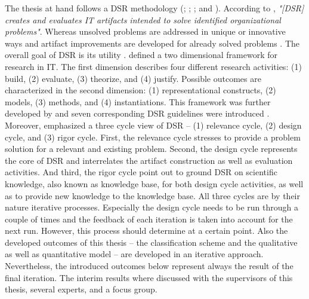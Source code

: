 The thesis at hand follows a \ac{DSR} methodology (\citealp{March1995}; \citealp{Hevner2004}; \citealp{Hevner2007}; and \citealp{Peffers2007}). According to \citet[p. 77]{Hevner2004}, \textit{"[\ac{DSR}] creates and evaluates IT artifacts intended to solve identified organizational problems"}. Whereas unsolved problems are addressed in unique or innovative ways and artifact improvements are developed for already solved problems \citep[p. 81]{Hevner2004}. The overall goal of \ac{DSR} is its utility \citep[p. 80]{Hevner2004}.
\citet[pp. 255-262]{March1995} defined a two dimensional framework for research in \ac{IT}. The first dimension describes four different research activities: (1) build, (2) evaluate, (3) theorize, and (4) justify. Possible outcomes are characterized in the second dimension: (1) representational constructs, (2) models, (3) methods, and (4) instantiations. This framework was further developed by \citet[pp. 78-81]{Hevner2004} and seven corresponding \ac{DSR} guidelines were introduced \citep[pp. 82-90]{Hevner2004}. Moreover, \citet[pp. 87-92]{Hevner2007} emphasized a three cycle view of \ac{DSR} -- (1) relevance cycle, (2) design cycle, and (3) rigor cycle. First, the relevance cycle stresses to provide a problem solution for a relevant and existing problem. Second, the design cycle represents the core of \ac{DSR} and interrelates the artifact construction as well as evaluation activities. And third, the rigor cycle point out to ground \ac{DSR} on scientific knowledge, also known as knowledge base, for both design cycle activities, as well as to provide new knowledge to the knowledge base. All three cycles are by their nature iterative processes. Especially the design cycle needs to be run through a couple of times and the feedback of each iteration is taken into account for the next run. However, this process should determine at a certain point. Also the developed outcomes of this thesis -- the classification scheme and the qualitative as well as quantitative model -- are developed in an iterative approach. Nevertheless, the introduced outcomes below represent always the result of the final iteration. The interim results where discussed with the supervisors of this thesis, several experts, and a focus group.

